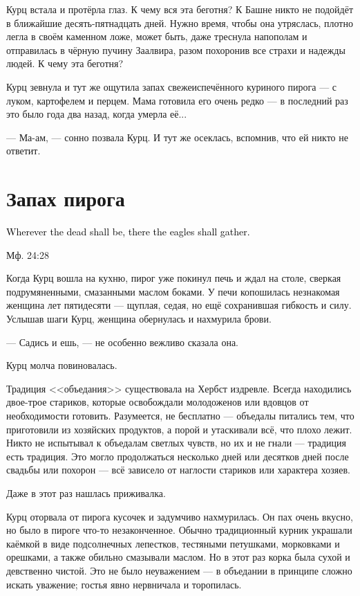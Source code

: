 \documentclass[a4paper,10pt,fleqn]{book}\usepackage{polyglossia}\setdefaultlanguage{english}\setotherlanguage{russian}\defaultfontfeatures{Ligatures=TeX,Mapping=tex-text}\usepackage{xcolor}\definecolor{lightgray}{HTML}{bbbbbb}\color{lightgray}\newcommand{\ml}[3]{\textcolor{black}{#3}}
\begin{document}
Курц встала и протёрла глаз.
К чему вся эта беготня?
К Башне никто не подойдёт в ближайшие десять-пятнадцать дней.
Нужно время, чтобы она утряслась, плотно легла в своём каменном ложе, может быть, даже треснула напополам и отправилась в чёрную пучину Заалвира, разом похоронив все страхи и надежды людей.
К чему эта беготня?

Курц зевнула и тут же ощутила запах свежеиспечённого куриного пирога --- с луком, картофелем и перцем.
Мама готовила его очень редко --- в последний раз это было года два назад, когда умерла её...

--- Ма-ам, --- сонно позвала Курц.
И тут же осеклась, вспомнив, что ей никто не ответит.

\section{Запах пирога}

\epigraph
{
\ml{$0$}
{Где будут павшие, там соберутся и орлы.}
{Wherever the dead shall be, there the eagles shall gather.}
}{Мф. 24:28}

Когда Курц вошла на кухню, пирог уже покинул печь и ждал на столе, сверкая подрумяненными, смазанными маслом боками.
У печи копошилась незнакомая женщина лет пятидесяти --- щуплая, седая, но ещё сохранившая гибкость и силу.
Услышав шаги Курц, женщина обернулась и нахмурила брови.

--- Садись и ешь, --- не особенно вежливо сказала она.

Курц молча повиновалась.

Традиция <<объедания>> существовала на Хербст издревле.
Всегда находились двое-трое стариков, которые освобождали молодоженов или вдовцов от необходимости готовить.
Разумеется, не бесплатно --- объедалы питались тем, что приготовили из хозяйских продуктов, а порой и утаскивали всё, что плохо лежит.
Никто не испытывал к объедалам светлых чувств, но их и не гнали --- традиция есть традиция.
Это могло продолжаться несколько дней или десятков дней после свадьбы или похорон --- всё зависело от наглости стариков или характера хозяев.

Даже в этот раз нашлась приживалка.

Курц оторвала от пирога кусочек и задумчиво нахмурилась.
Он пах очень вкусно, но было в пироге что-то незаконченное.
Обычно традиционный курник украшали каёмкой в виде подсолнечных лепестков, тестяными петушками, морковками и орешками, а также обильно смазывали маслом.
Но в этот раз корка была сухой и девственно чистой.
Это не было неуважением --- в объедании в принципе сложно искать уважение;
гостья явно нервничала и торопилась.
\end{document}
